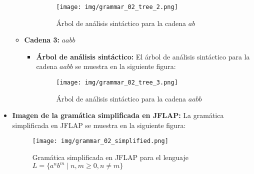 \documentclass[11pt]{report}
\begin{document}
\begin{itemize}
\begin{itemize}
\begin{itemize}
\begin{figure}[H]
        \texttt{[image: img/grammar\_02\_tree\_2.png]}
        \caption{Árbol de análisis sintáctico para la cadena $ab$}
        \label{fig:arbol5}
      \end{figure}
    \end{itemize}
    \item \textbf{Cadena 3:} $aabb$
    \begin{itemize}
      \item \textbf{Árbol de análisis sintáctico:} El árbol de análisis sintáctico para la cadena $aabb$ se muestra en la siguiente figura:
      \begin{figure}[H]
        \centering
        \texttt{[image: img/grammar\_02\_tree\_3.png]}
        \caption{Árbol de análisis sintáctico para la cadena $aabb$}
        \label{fig:arbol6}
      \end{figure}
    \end{itemize}
  \end{itemize}
  \item \textbf{Imagen de la gramática simplificada en JFLAP:} La gramática simplificada en JFLAP se muestra en la siguiente figura:
  \begin{figure}[H]
    \centering
    \texttt{[image: img/grammar\_02\_simplified.png]}
    \caption{Gramática simplificada en JFLAP para el lenguaje $L = \{a^n b^m \mid n, m \geq 0, n \neq m\}$}
    \label{fig:gramatica2_simplified}
  \end{figure}
\end{itemize}
\end{document}
